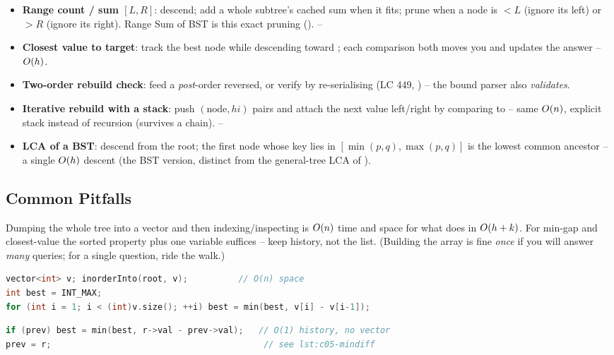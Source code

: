 \begin{itemize}[nosep]
  \item \textbf{Range count / sum $[L,R]$}: descend; add a whole subtree's cached sum when it
        fits; prune when a node is $<L$ (ignore its left) or $>R$ (ignore its right). Range Sum of BST
        is this exact pruning (). \hfill{}--
  \item \textbf{Closest value to target}: track the best node while descending toward ;
        each comparison both moves you and updates the answer -- $O(h)$. \hfill{}
  \item \textbf{Two-order rebuild check}: feed  a \emph{post}-order reversed, or
        verify by re-serialising (LC 449, ) -- the bound parser also \emph{validates}. \hfill{}
  \item \textbf{Iterative rebuild with a stack}: push $(\text{node},\mathit{hi})$ pairs and attach the
        next value left/right by comparing to  -- same $O(n)$, explicit stack instead of
        recursion (survives a chain). \hfill{}--
  \item \textbf{LCA of a BST}: descend from the root; the first node whose key lies in
        $[\min(p,q),\max(p,q)]$ is the lowest common ancestor -- a single $O(h)$ descent (the BST
        version, distinct from the general-tree LCA of ). \hfill{}
\end{itemize}

\subsection{Common Pitfalls}\label{sec:c05-queries-pitfalls}

\begin{warningbox}
Dumping the whole tree into a vector and then indexing/inspecting is $O(n)$ time and space for
what  does in $O(h+k)$. For min-gap and closest-value the sorted property plus
one  variable suffices -- keep history, not the list. (Building the array is fine \emph{once}
if you will answer \emph{many} queries; for a single question, ride the walk.)
\end{warningbox}
\begin{lstlisting}[caption={\textcolor{warningred}{WRONG}: collect everything to find one successor's neighbour}, language=C++, basicstyle=\ttfamily\small]
vector<int> v; inorderInto(root, v);          // O(n) space
int best = INT_MAX;
for (int i = 1; i < (int)v.size(); ++i) best = min(best, v[i] - v[i-1]);
\end{lstlisting}
\begin{lstlisting}[caption={\textcolor{successgreen}{RIGHT}: stream inorder, remember only the predecessor}, language=C++, basicstyle=\ttfamily\small]
if (prev) best = min(best, r->val - prev->val);   // O(1) history, no vector
prev = r;                                          // see lst:c05-mindiff
\end{lstlisting}

